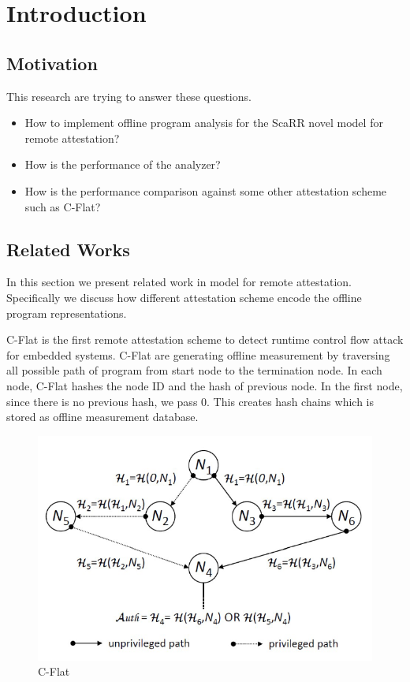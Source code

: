 
\chapter{Introduction} %

\label{Chapter1} %


\section{Motivation}

This research are trying to answer these questions.
\begin{itemize}
    \item How to implement offline program analysis for the ScaRR novel model for remote attestation?
    \item How is the performance of the analyzer?
    \item How is the performance comparison against some other attestation scheme such as C-Flat?
\end{itemize}

\section{Related Works}

In this section we present related work in model for remote attestation. Specifically we discuss how different attestation scheme encode the offline program representations.

C-Flat \cite{aberaCFLATControlFlowAttestation2016} is the first remote attestation scheme to detect runtime control flow attack for embedded systems. C-Flat are generating offline measurement by traversing all possible path of program from start node to the termination node. In each node, C-Flat hashes the node ID and the hash of previous node. In the first node, since there is no previous hash, we pass 0. This creates hash chains which is stored as offline measurement database.

\begin{figure}[htbp]
\centerline{\includegraphics[scale=.5]{Figures/cflat.png}}
\caption{C-Flat}
\label{fig:1-1}
\end{figure}

